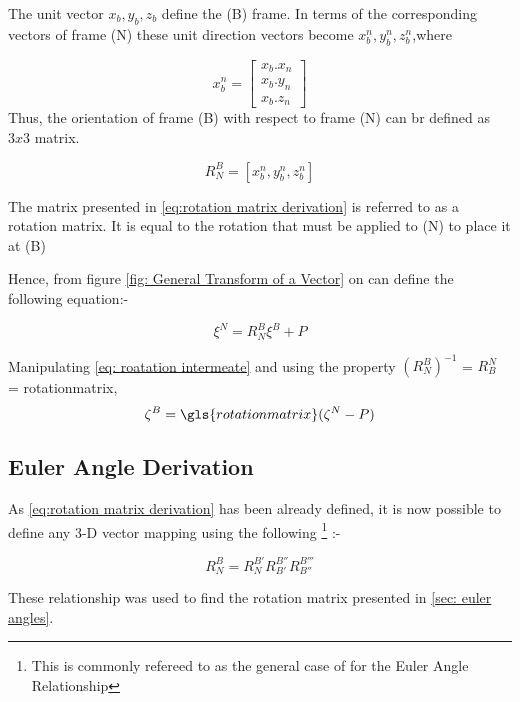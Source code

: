 	The unit vector $x_b,y_b,z_b$ define the (B) frame. In terms of the corresponding vectors of frame (N) these unit direction vectors become $x_b^n,y_b^n,z_b^n$,where
	
	\begin{equation}
	x_b^n = \begin{bmatrix}
	       x_b.x_n\\
	       x_b.y_n\\
	       x_b.z_n
	\end{bmatrix}
	\end{equation}
	Thus, the orientation of frame (B) with respect to frame (N) can br defined as $3x3$ matrix.
	
	\begin{equation}
	R_N^B = [x_b^n,y_b^n,z_b^n]
	\label{eq:rotation matrix derivation}
	\end{equation}
	
	The matrix presented in \ref{eq:rotation matrix derivation} is referred to as a rotation matrix. It  is equal to the rotation that must be applied to (N) to place it at (B)
	
	Hence, from figure \ref{fig: General Transform of a Vector} on can define the following equation:-
	
	\begin{equation}
	\xi^N = R_N^B\xi^B + P
	\label{eq: roatation intermeate}
	\end{equation} 
	
	Manipulating \eqref{eq: roatation intermeate} and using the property $(R^B_N)^{-1}$ = $R_B^N$ = \gls{rotationmatrix},
	\begin{equation}
	\zeta^B = \gls{rotationmatrix}(\zeta^N-P)
	\end{equation}
	
	\subsection{Euler Angle Derivation} 
	
	As \eqref{eq:rotation matrix derivation} has been already defined, it is now possible to define any 3-D vector mapping using the following \footnote{This is commonly refereed to as the general case of for the Euler Angle Relationship} :-
	
	\begin{equation}
	R^B_N =R^{B'}_N R^{B''}_{B'} R^{B'''}_{B''} 
	\end{equation}
	
	These relationship was used to find the rotation matrix presented in \ref{sec: euler angles}.

